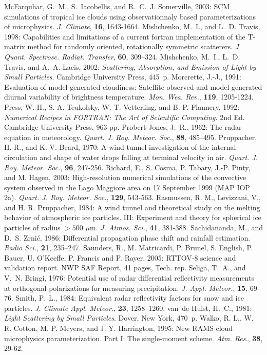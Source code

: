 \decrefname
McFarquhar, G.~M., S.~Iacobellis, and R.~C.~J. Somerville, 2003: 
  SCM simulations of tropical ice clouds using observationnaly based
  parameterizations of microphysics. {\it J. Climate}, {\bf 16}, 1643-1664.
\decrefname
Mishchenko, M.~I., and L.~D. Travis, 1998: Capabilities and limitations of a
  current {\sc fortran} implementation of the {T}-matrix method for randomly
  oriented, rotationally symmetric scatterers. {\em J. Quant. Spectrosc.
  Radiat. Transfer}, {\bf 60}, 309--324.
\decrefname
Mishchenko, M.~I., L.~D. Travis, and A.~A. Lacis, 2002: {\em Scattering, Absorption, and
  Emission of Light by Small Particles}. Cambridge University Press, 445~p.
\decrefname
Morcrette, J.-J., 1991: Evaluation of model-generated cloudiness: 
Satellite-observed and model-generated diurnal variability of
brightness temperature.
      {\it Mon. Wea. Rev.}, 
      {\bf 119},
      1205-1224.
\decrefname
Press, W. H., S. A. Teukolsky, W. T. Vetterling, and B. P. Flannery, 1992:
      {\it Numerical Recipes in FORTRAN: The Art of Scientific Computing.}
      2nd Ed.
      Cambridge University Press,
      963 pp.
\decrefname
Probert-Jones, J.~R., 1962: The radar equation in meteorology. {\em Quart. J.
  Roy. Meteor. Soc.}, {\bf 88}, 485--495.
\decrefname
Pruppacher, H. R., and K. V. Beard, 1970: 
      A wind tunnel investigation of the internal circulation and shape of 
      water drops falling at terminal velocity in air.
      {\it Quart. J. Roy. Meteor. Soc.},
      {\bf 96},
      247-256.
\decrefname
Richard, E., S. Cosma, P. Tabary, J.-P. Pinty, and M. Hagen, 2003:
      High-resolution numerical simulations of the convective system observed
      in the Lago Maggiore area on 17 September 1999 (MAP IOP 2a).
      {\it Quart. J. Roy. Meteor. Soc.},
      {\bf 129},
      543-563.
\decrefname
Rasmussen, R. M., Levizzani, V., and H. R. Pruppacher, 1984:
      A wind tunnel and theoretical study on the melting behavior of 
      atmospheric ice particles. III: Experiment and theory for spherical 
      ice particles of radius $>500$ $\mu$m.
      {\it J. Atmos. Sci.},
      {\bf 41},
      381-388.
\decrefname
Sachidananda, M., and D.~S. Zrni\'c, 1986: Differential propagation phase shift
  and rainfall estimation. {\em Radio Sci.}, {\bf 21}, 235--247.
\decrefname
Saunders, R., M. Matricardi, P. Brunel, S. English, P. Bauer, U. O'Keeffe, P.
Francis and P. Rayer, 2005: RTTOV-8 science and validation report. NWP SAF
Report, 41 pages, Tech. rep.
\decrefname
Seliga, T.~A., and V.~N. Bringi, 1976: Potential use of radar differential
  reflectivity measurements at orthogonal polarizations for measuring
  precipitation. {\em J. Appl. Meteor.}, {\bf 15}, 69--76.
\decrefname
Smith, P.~L., 1984: Equivalent radar reflectivity factors for snow and ice
  particles. {\em J. Climate Appl. Meteor.}, {\bf 23}, 1258--1260.
\decrefname
van~de Hulst, H.~C., 1981: {\em Light Scattering by Small Particles}. Dover,
  New York, 470~p.
\decrefname
Walko, R. L., W. R. Cotton, M. P. Meyers, and J. Y. Harrington, 1995:
      New RAMS cloud microphysics parameterization. Part I: The single-moment
      scheme.
      {\it Atm. Res.},
      {\bf 38},
      29-62.
\decrefname


